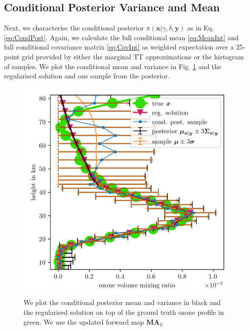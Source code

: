 \subsection{Conditional Posterior Variance and Mean}
Next, we characterise the conditional posterior $\pi(\bm{x}|\gamma, \delta, \bm{y})$ as in Eq. \ref{eq:CondPost}. 
Again, we calculate the full conditional mean \ref{eq:MeanInt} and full conditional covariance matrix \ref{eq:CovInt} as weighted expectation over a 25-point grid provided by either the marginal TT approximations or the histogram of samples.
We plot the conditional mean and variance in Fig. \ref{fig:O3SolplsReg} and the regularised solution and one sample from the posterior.
\begin{figure}[ht!]
	\centering
	\includegraphics{SecRecResinclRegandSampl.png}
	\caption[Ozone posterior mean and variance and the regularised solution compared to the ground truth.]{We plot the conditional posterior mean and variance in black and the regularised solution on top of the ground truth ozone profile in green. We use the updated forward map $\bm{M}\bm{A}_L$}
	\label{fig:O3SolplsReg}
\end{figure}

